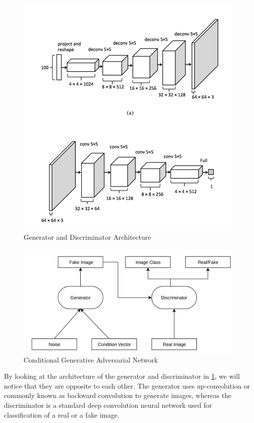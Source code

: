 \begin{figure}[H]
  \centering
    \includegraphics[scale=.3, angle=0]{Files/DCGAN.png}
    \caption[Generator and Discriminator  Architecture]{Generator and Discriminator Architecture\cite{DCGAN}}
    \label{fig:DCGAN}
\end{figure}

\begin{figure}[H]
  \centering
    \includegraphics[scale=.3, angle=0]{Files/cgan.png}
    \caption[Conditional Generative Adversarial Network]{Conditional Generative Adversarial Network}
    \label{fig:CGAN}
\end{figure}
By looking at the architecture of the generator and discriminator in \cref{fig:DCGAN}, we will notice that they are  opposite to each other. The generator uses up-convolution or commonly known as backward convolution to generate images, whereas %
the discriminator is a standard deep convolution neural network used for classification of a real or a fake image.


